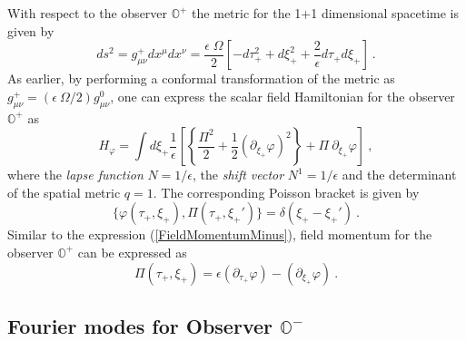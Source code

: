 \documentclass[aps,twocolumn,showpacs]{revtex4}
\def\observerminus{\mathbb{O}^{-}}
\def\observerplus{\mathbb{O}^{+}}
\begin{document}
With respect to the observer $\observerplus$ the metric for the 1+1 dimensional 
spacetime is given by
%
\begin{equation}\label{NearNullMetricPlus}
ds^2 = g^{+}_{\mu\nu}dx^{\mu}dx^{\nu} = \frac{\epsilon\; \Omega}{2}
\left[ - d\tau_{+}^2 + d\xi_{+}^2 
+ \frac{2}{\epsilon} d\tau_{+} d\xi_{+} \right]  ~. 
\end{equation}
%
As earlier, by performing a conformal transformation of the metric as 
$g^{+}_{\mu\nu} = (\epsilon ~\Omega/2) g^{0}_{\mu\nu}$, one can express the 
scalar field Hamiltonian for the observer $\observerplus$ as
%
\begin{equation}\label{ScalarHamiltonianFullPlus}
H_{\varphi} = \int d\xi_{+}  \frac{1}{\epsilon} \left[
\left\{ \frac{\Pi^2}{2}  + \frac{1}{2}  (\partial_{\xi_{+}}\varphi)^2 \right\} 
+ \Pi~ \partial_{\xi_{+}} \varphi \right] ~,
\end{equation}
%
where the \emph{lapse function} $N = 1/\epsilon$, the \emph{shift 
vector} $N^1 = 1/\epsilon$ and the determinant of the spatial metric
$q = 1$.  The corresponding Poisson bracket is given by
%
\begin{equation}\label{PoissonBracketPlus}
\{\varphi(\tau_{+},\xi_{+}), \Pi(\tau_{+},\xi_{+}')\} = \delta(\xi_{+} - 
\xi_{+}') ~.
\end{equation}
%
Similar to the expression (\ref{FieldMomentumMinus}), field momentum for the
observer $\observerplus$ can be expressed as 
%
\begin{equation}\label{FieldMomentumPlus}
\Pi(\tau_{+},\xi_{+}) = \epsilon (\partial_{\tau_{+}}\varphi) 
- (\partial_{\xi_{+}}\varphi) ~.
\end{equation}
%



\subsection{Fourier modes for Observer $\observerminus$ }
\end{document}
